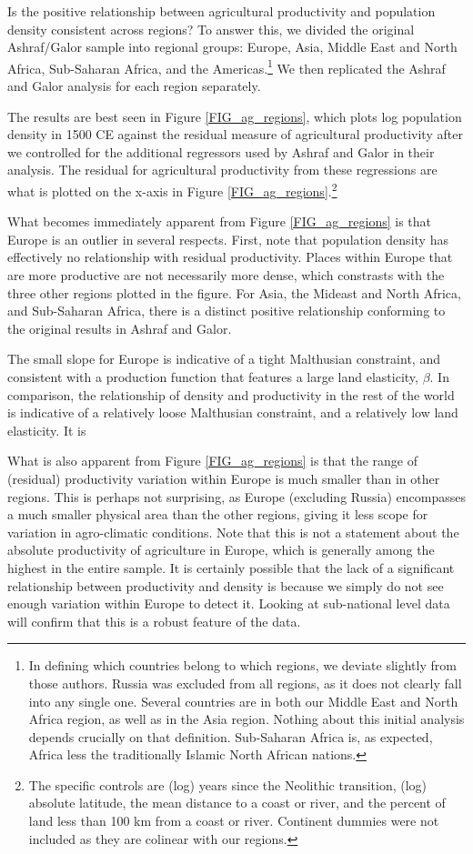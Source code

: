 \documentclass[10pt]{article}
\begin{document}
Is the positive relationship between agricultural productivity and population density consistent across regions? To answer this, we divided the original Ashraf/Galor sample into regional groups: Europe, Asia, Middle East and North Africa, Sub-Saharan Africa, and the Americas.\footnote{In defining which countries belong to which regions, we deviate slightly from those authors. Russia was excluded from all regions, as it does not clearly fall into any single one. Several countries are in both our Middle East and North Africa region, as well as in the Asia region. Nothing about this initial analysis depends crucially on that definition. Sub-Saharan Africa is, as expected, Africa less the traditionally Islamic North African nations.} We then replicated the Ashraf and Galor analysis for each region separately.

The results are best seen in Figure \ref{FIG_ag_regions}, which plots log population density in 1500 CE against the residual measure of agricultural productivity after we controlled for the additional regressors used by Ashraf and Galor in their analysis. The residual for agricultural productivity from these regressions are what is plotted on the x-axis in Figure \ref{FIG_ag_regions}.\footnote{The specific controls are (log) years since the Neolithic transition, (log) absolute latitude, the mean distance to a coast or river, and the percent of land less than 100 km from a coast or river. Continent dummies were not included as they are colinear with our regions.}

What becomes immediately apparent from Figure \ref{FIG_ag_regions} is that Europe is an outlier in several respects. First, note that population density has effectively no relationship with residual productivity. Places within Europe that are more productive are not necessarily more dense, which constrasts with the three other regions plotted in the figure. For Asia, the Mideast and North Africa, and Sub-Saharan Africa, there is a distinct positive relationship conforming to the original results in Ashraf and Galor.

The small slope for Europe is indicative of a tight Malthusian constraint, and consistent with a production function that features a large land elasticity, $\beta$. In comparison, the relationship of density and productivity in the rest of the world is indicative of a relatively loose Malthusian constraint, and a relatively low land elasticity. It is 

What is also apparent from Figure \ref{FIG_ag_regions} is that the range of (residual) productivity variation within Europe is much smaller than in other regions. This is perhaps not surprising, as Europe (excluding Russia) encompasses a much smaller physical area than the other regions, giving it less scope for variation in agro-climatic conditions. Note that this is not a statement about the absolute productivity of agriculture in Europe, which is generally among the highest in the entire sample. It is certainly possible that the lack of a significant relationship between productivity and density is because we simply do not see enough variation within Europe to detect it. Looking at sub-national level data will confirm that this is a robust feature of the data.
\end{document}
